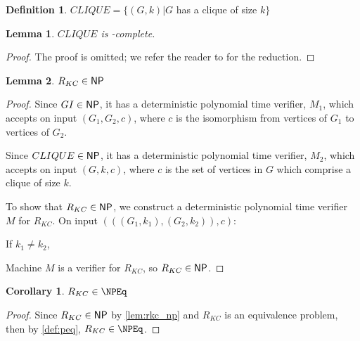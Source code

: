 \documentclass{amsart}
\newtheorem{lemma}[lemma]{Lemma}
\newtheorem{corollary}[corollary]{Corollary}
\theoremstyle{definition} \newtheorem{definition}[definition]{Definition}
\begin{document}
\begin{definition}
  $CLIQUE=\{(G,k)|G$ has a clique of size $k\}$
\end{definition}

\begin{lemma}$CLIQUE$ is \NP-complete.\end{lemma}
\begin{proof}
  The proof is omitted; we refer the reader to \cite{gj79} for the reduction.
\end{proof}

\begin{lemma}\label{lem:rkc_np}$R_{KC}\in{\ensuremath{\mathsf{NP}}}$\end{lemma}
\begin{proof}
  Since $GI\in{\ensuremath{\mathsf{NP}}}$, it has a deterministic polynomial time verifier, $M_1$,
  which accepts on input $(G_1, G_2, c)$, where $c$ is the isomorphism from
  vertices of $G_1$ to vertices of $G_2$.

  Since $CLIQUE\in{\ensuremath{\mathsf{NP}}}$, it has a deterministic polynomial time verifier, $M_2$,
  which accepts on input $(G, k, c)$, where $c$ is the set of vertices in $G$
  which comprise a clique of size $k$.

  To show that $R_{KC}\in{\ensuremath{\mathsf{NP}}}$, we construct a deterministic polynomial time
  verifier $M$ for $R_{KC}$. On input $(((G_1, k_1), (G_2, k_2)), c)$:\\
  \begin{algorithm}[H]
    If $k_1\neq k_2$, \REJECT\;
  \end{algorithm}
  
  Machine $M$ is a verifier for $R_{KC}$, so $R_{KC}\in{\ensuremath{\mathsf{NP}}}$.
\end{proof}

\begin{corollary}\label{cor:rkc_npeq}$R_{KC}\in\NPEq$\end{corollary}
\begin{proof}
  Since $R_{KC}\in{\ensuremath{\mathsf{NP}}}$ by \autoref{lem:rkc_np} and $R_{KC}$ is an equivalence
  problem, then by \autoref{def:peq}, $R_{KC}\in\NPEq$.
\end{proof}
\end{document}
